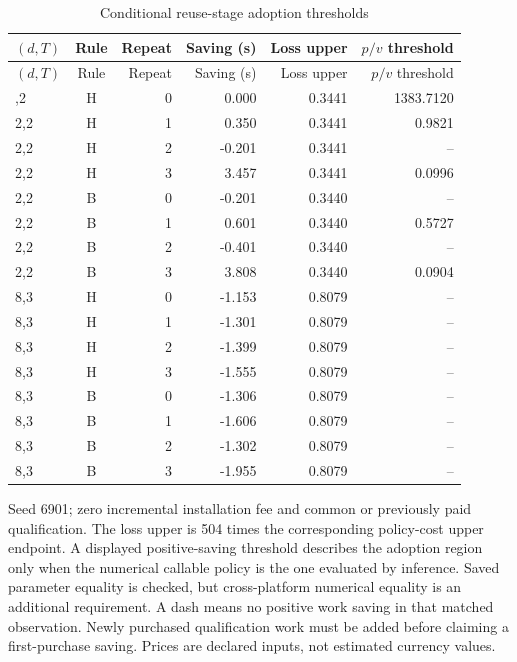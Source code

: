 \begingroup\small\setlength{\tabcolsep}{3pt}
\begin{longtable}{lcrrrr}
\caption{Conditional reuse-stage adoption thresholds}\label{tab:adoption70}\\
\hline
$(d,T)$ & Rule & Repeat & Saving (s) & Loss upper & $p/v$ threshold \\
\hline\endfirsthead
\hline
$(d,T)$ & Rule & Repeat & Saving (s) & Loss upper & $p/v$ threshold \\
\hline\endhead
\hline\endfoot
\hline\endlastfoot
2,2 & H & 0 & 0.000 & 0.3441 & 1383.7120 \\
2,2 & H & 1 & 0.350 & 0.3441 & 0.9821 \\
2,2 & H & 2 & -0.201 & 0.3441 & -- \\
2,2 & H & 3 & 3.457 & 0.3441 & 0.0996 \\
2,2 & B & 0 & -0.201 & 0.3440 & -- \\
2,2 & B & 1 & 0.601 & 0.3440 & 0.5727 \\
2,2 & B & 2 & -0.401 & 0.3440 & -- \\
2,2 & B & 3 & 3.808 & 0.3440 & 0.0904 \\
8,3 & H & 0 & -1.153 & 0.8079 & -- \\
8,3 & H & 1 & -1.301 & 0.8079 & -- \\
8,3 & H & 2 & -1.399 & 0.8079 & -- \\
8,3 & H & 3 & -1.555 & 0.8079 & -- \\
8,3 & B & 0 & -1.306 & 0.8079 & -- \\
8,3 & B & 1 & -1.606 & 0.8079 & -- \\
8,3 & B & 2 & -1.302 & 0.8079 & -- \\
8,3 & B & 3 & -1.955 & 0.8079 & -- \\
\end{longtable}\endgroup
{\footnotesize Seed 6901; zero incremental installation fee and common or previously paid qualification. The loss upper is 504 times the corresponding policy-cost upper endpoint. A displayed positive-saving threshold describes the adoption region only when the numerical callable policy is the one evaluated by inference. Saved parameter equality is checked, but cross-platform numerical equality is an additional requirement. A dash means no positive work saving in that matched observation. Newly purchased qualification work must be added before claiming a first-purchase saving. Prices are declared inputs, not estimated currency values.}\par
